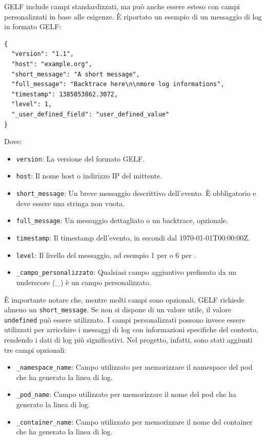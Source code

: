 GELF include campi standardizzati, ma può anche essere esteso con campi personalizzati in base alle esigenze. È riportato un esempio di un messaggio di log in formato GELF:

\begin{lstlisting}[caption={Esempio di messaggio in formato GELF.},label=lst:gelf-code, escapechar=|, keywordstyle=\color{black}, commentstyle=\color{black},stringstyle=\color{black},numberstyle=\color{black}]
{
  "version": "1.1",
  "host": "example.org",
  "short_message": "A short message",
  "full_message": "Backtrace here\n\nmore log informations",
  "timestamp": 1385053862.3072,
  "level": 1,
  "_user_defined_field": "user_defined_value"
}
\end{lstlisting}

Dove:

\begin{itemize}
  \item \texttt{version}: La versione del formato GELF.
  \item \texttt{host}: Il nome host o indirizzo IP del mittente.
  \item \texttt{short\_message}: Un breve messaggio descrittivo dell'evento. È obbligatorio e deve essere una stringa non vuota.
  \item \texttt{full\_message}: Un messaggio dettagliato o un backtrace, opzionale.
  \item \texttt{timestamp}: Il timestamp dell'evento, in secondi dal 1970-01-01T00:00:00Z.
  \item \texttt{level}: Il livello del messaggio, ad esempio 1 per  o 6 per .
  \item \texttt{\_campo\_personalizzato}: Qualsiasi campo aggiuntivo prefissato da un underscore (\_) è un campo personalizzato.
\end{itemize}

È importante notare che, mentre molti campi sono opzionali, GELF richiede almeno un \texttt{short\_message}. Se non si dispone di un valore utile, il valore \texttt{undefined} può essere utilizzato. I campi personalizzati possono invece essere utilizzati per arricchire i messaggi di log con informazioni specifiche del contesto, rendendo i dati di log più significativi. Nel progetto, infatti, sono stati aggiunti tre campi opzionali:
\begin{itemize}
    \item \texttt{\_namespace\_name}: Campo utilizzato per memorizzare il namespace del pod che ha generato la linea di log.
    \item \texttt{\_pod\_name}: Campo utilizzato per memorizzare il nome del pod che ha generato la linea di log.
    \item \texttt{\_container\_name}: Campo utilizzato per memorizzare il nome del container che ha generato la linea di log.
    
\end{itemize}


